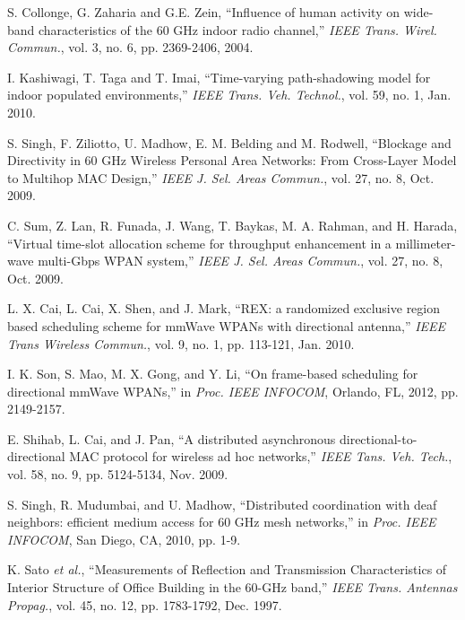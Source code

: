 \documentclass[10pt, conference, letterpaper]{IEEEtran}
\begin{document}
\begin{thebibliography}{50}
S. Collonge, G. Zaharia and G.E. Zein, ``Influence of human activity on wide-band characteristics of the 60 GHz indoor radio channel,'' \emph{IEEE Trans. Wirel. Commun.}, vol. 3,  no. 6, pp. 2369-2406, 2004.

I. Kashiwagi, T. Taga and T. Imai, ``Time-varying path-shadowing model for indoor populated environments,'' \emph{IEEE Trans. Veh. Technol.}, vol. 59, no. 1, Jan. 2010.

S. Singh, F. Ziliotto, U. Madhow, E. M. Belding and M. Rodwell, ``Blockage and Directivity in 60 GHz Wireless Personal Area Networks: From Cross-Layer Model to Multihop MAC Design,'' \emph{IEEE J. Sel. Areas Commun.}, vol. 27, no. 8, Oct. 2009.


C. Sum, Z. Lan, R. Funada, J. Wang, T. Baykas, M. A. Rahman, and H. Harada, ``Virtual time-slot allocation scheme for throughput enhancement in a millimeter-wave multi-Gbps WPAN system,'' \emph{IEEE J. Sel. Areas Commun.}, vol. 27, no. 8, Oct. 2009.

L. X. Cai, L. Cai, X. Shen, and J. Mark, ``REX: a randomized exclusive region based scheduling scheme for mmWave WPANs with directional antenna,'' \emph{IEEE Trans Wireless Commun.}, vol. 9, no. 1, pp. 113-121, Jan. 2010. 

I. K. Son, S. Mao, M. X. Gong, and Y. Li, ``On frame-based scheduling for directional mmWave WPANs,'' in \emph{Proc. IEEE INFOCOM}, Orlando, FL, 2012, pp. 2149-2157.

E. Shihab, L. Cai, and J. Pan, ``A distributed asynchronous directional-to-directional MAC protocol for wireless ad hoc networks,'' \emph{IEEE Tans. Veh. Tech.}, vol. 58, no. 9, pp. 5124-5134, Nov. 2009. 

S. Singh, R. Mudumbai, and U. Madhow, ``Distributed coordination with deaf neighbors: efficient medium access for 60 GHz mesh networks,'' in \emph{Proc. IEEE INFOCOM}, San Diego, CA, 2010, pp. 1-9.


K. Sato \emph{et al.}, ``Measurements of Reflection and Transmission Characteristics of Interior Structure of Office Building in the 60-GHz band,'' \emph{IEEE Trans. Antennas Propag.}, vol. 45, no. 12, pp. 1783-1792, Dec. 1997.


\end{thebibliography}
\end{document}
